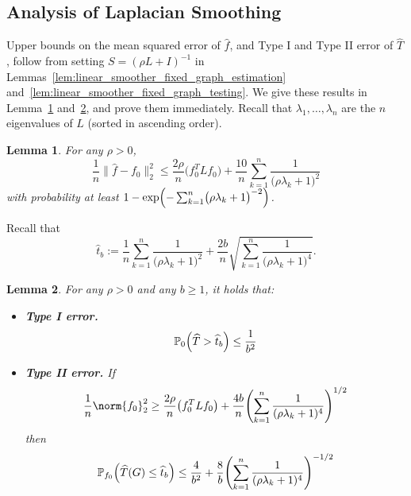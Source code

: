 \documentclass[twoside]{article}
\newcommand{\1}{\mathbf{1}}
\newcommand{\Lap}{L}
\newcommand{\Pbb}{\mathbb{P}}
\newcommand{\wh}[1]{\widehat{#1}}
\newtheorem{lemma}{Lemma}
\theoremstyle{definition}
\theoremstyle{remark}
\begin{document}
\subsection{Analysis of Laplacian Smoothing}
Upper bounds on the mean squared error of $\wh{f}$, and Type I and Type II error of $\wh{T}$, follow from setting $S = (\rho L + I)^{-1}$ in Lemmas~\ref{lem:linear_smoother_fixed_graph_estimation} and~\ref{lem:linear_smoother_fixed_graph_testing}. We give these results in Lemma~\ref{lem:ls_fixed_graph_estimation} and~\ref{lem:ls_fixed_graph_testing}, and prove them immediately. Recall that $\lambda_1,\ldots,\lambda_n$ are the $n$ eigenvalues of $\Lap$ (sorted in ascending order).
\begin{lemma}
	\label{lem:ls_fixed_graph_estimation}
	For any $\rho > 0$,
	\begin{equation}
	\label{eqn:ls_fixed_graph_estimation_prob}
	\frac{1}{n}\bigl\|\wh{f} - f_0\bigr\|_2^2 \leq \frac{2\rho}{n} \bigl(f_0^T \Lap f_0\bigr) + \frac{10}{n}\sum_{k = 1}^{n} \frac{1}{\bigl(\rho \lambda_{k} + 1\bigr)^2}
	\end{equation}
	with probability at least $1 - \exp\Bigl(-\sum_{k = 1}^{n}\bigl(\rho \lambda_k + 1\bigr)^{-2}\Bigr)$.
\end{lemma}
Recall that 
\begin{equation*}
\wh{t}_b := \frac{1}{n}\sum_{k = 1}^{n} \frac{1}{\bigl(\rho \lambda_k + 1\bigr)^2} + \frac{2b}{n}\sqrt{\sum_{k = 1}^{n} \frac{1}{\bigl(\rho \lambda_k + 1\bigr)^4}}.
\end{equation*}
\begin{lemma}
	\label{lem:ls_fixed_graph_testing}
	For any $\rho > 0$ and any $b \geq 1$, it holds that:
	\begin{itemize}
		\item \textbf{Type I error.}
		\begin{equation}
		\label{eqn:ls_fixed_graph_testing_typeI}
		\Pbb_0\Bigl(\wh{T} > \wh{t}_b\Bigr) \leq \frac{1}{b^2}
		\end{equation}
		\item \textbf{Type II error.} If
		\begin{equation}
		\label{eqn:ls_fixed_graph_testing_critical_radius}
		\frac{1}{n}\norm{f_0}_2^2 \geq \frac{2 \rho}{n} \bigl(f_0^T \Lap f_0\bigr) + \frac{4b}{n} \Biggl(\sum_{k = 1}^{n} \frac{1}{(\rho\lambda_k + 1)^4} \Biggr)^{1/2}
		\end{equation}
		then
		\begin{equation}
		\label{eqn:ls_fixed_graph_testing_typeII}
		\Pbb_{f_0}\Bigl(\wh{T}(G) \leq \wh{t}_b\Bigr) \leq \frac{4}{b^2} + \frac{8}{b} \Biggl(\sum_{k = 1}^{n} \frac{1}{(\rho\lambda_k + 1)^4} \Biggr)^{-1/2}
		\end{equation}
	\end{itemize}
\end{lemma}
\end{document}
